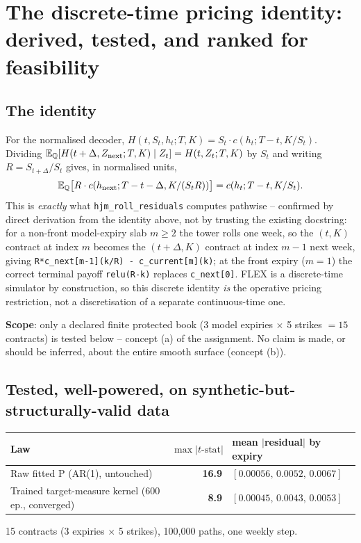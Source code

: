 \section{The discrete-time pricing identity: derived, tested, and ranked for feasibility}
\label{sec:sec23}

\subsection{The identity}

For the normalised decoder, $H(t,S_t,h_t;T,K)=S_t\cdot c(h_t;T-t,K/S_t)$.
Dividing $\mathbb E_\mathbb Q[H(t+\Delta,Z_{\text{next}};T,K)\mid Z_t]=H(t,Z_t;T,K)$ by $S_t$
and writing $R=S_{t+\Delta}/S_t$ gives, in normalised units,
\[
\mathbb E_\mathbb Q\bigl[R\cdot c(h_{\text{next}};T-t-\Delta,K/(S_tR))\bigr]=c(h_t;T-t,K/S_t).
\]
This is \emph{exactly} what \texttt{hjm\_roll\_residuals} computes pathwise --
confirmed by direct derivation from the identity above, not by trusting the
existing docstring: for a non-front model-expiry slab $m\geq2$ the tower rolls
one week, so the $(t,K)$ contract at index $m$ becomes the $(t+\Delta,K)$
contract at index $m-1$ next week, giving
\texttt{R*c\_next[m-1](k/R) - c\_current[m](k)}; at the front expiry
($m=1$) the correct terminal payoff \texttt{relu(R-k)} replaces
\texttt{c\_next[0]}. FLEX is a discrete-time simulator by construction, so
this discrete identity \emph{is} the operative pricing restriction, not a
discretisation of a separate continuous-time one.

\textbf{Scope}: only a declared finite protected book (3 model expiries
$\times$ 5 strikes $=15$ contracts) is tested below -- concept (a) of the
assignment. No claim is made, or should be inferred, about the entire smooth
surface (concept (b)).

\subsection{Tested, well-powered, on synthetic-but-structurally-valid data}

\begin{center}
\begin{tabular}{p{}rl}
\toprule
Law & $\max|t\text{-stat}|$ & mean $|$residual$|$ by expiry \\
\midrule
Raw fitted P (AR(1), untouched) & \textbf{16.9} & $[0.00056,\,0.0052,\,0.0067]$ \\
Trained target-measure kernel (600 ep., converged) & \textbf{8.9} & $[0.00045,\,0.0043,\,0.0053]$ \\
\bottomrule
\end{tabular}
\par\vspace{2pt}\noindent\footnotesize 15 contracts (3 expiries $\times$ 5 strikes), 100{,}000 paths, one weekly step.
\end{center}

